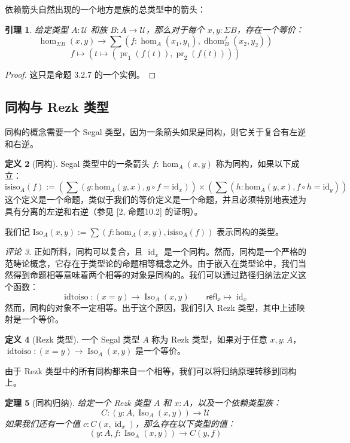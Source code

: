 \documentclass{ctexrep}
\theoremstyle{plain}
\newtheorem{theorem}{定理}[section]
\newtheorem{lemma}[theorem]{引理}
\theoremstyle{definition}
\newtheorem{definition}[theorem]{定义}
\theoremstyle{remark}
\newtheorem{remark}[theorem]{评论}
\theoremstyle{definition}
\theoremstyle{definition}
\theoremstyle{definition}
\newcommand{\refl}{\mathsf{refl}}
\newcommand{\id}{\operatorname{id}}
\newcommand{\UU}{\mathcal{U}}
\newcommand{\dhom}{\operatorname{dhom}}
\newcommand{\Iso}{\operatorname{Iso}}
\newcommand{\idtoiso}{\operatorname{idtoiso}}
\begin{document}
依赖箭头自然出现的一个地方是族的总类型中的箭头：

\begin{lemma}
给定类型 $A:\UU$ 和族 $B:A\to\UU$，那么对于每个 $x,y:\Sigma B$，存在一个等价：
\[
\hom_{\Sigma B}(x,y) \to \sum \left( f:\hom_A(x_1,y_1), \dhom_B^f(x_2,y_2) \right)
\]
\[
f \mapsto (t \mapsto (\operatorname{pr}_1(f(t)), \operatorname{pr}_2(f(t))))
\]
\end{lemma}

\begin{proof}
这只是命题 3.2.7 的一个实例。
\end{proof}

\subsection{同构与 Rezk 类型}

同构的概念需要一个 Segal 类型，因为一条箭头如果是同构，则它关于复合有左逆和右逆。

\begin{definition}[同构]
Segal 类型中的一条箭头 $f:\hom_A(x,y)$ 称为同构，如果以下成立：
\[
\text{isiso}_A(f) := \left( \sum (g : \text{hom}_A(y, x), g \circ f = \text{id}_x) \right) \times \left( \sum (h : \text{hom}_A(y, x), f \circ h = \text{id}_y) \right)
\]
这个定义是一个命题，类似于我们的等价定义是一个命题，并且必须特别地表述为具有分离的左逆和右逆（参见 [2, 命题10.2] 的证明）。

我们记 $\text{Iso}_A(x, y) := \sum (f : \text{hom}_A(x, y), \text{isiso}_A(f))$ 表示同构的类型。
\end{definition}

\begin{remark}
正如所料，同构可以复合，且 $\id_x$ 是一个同构。然而，同构是一个严格的范畴论概念，它存在于类型论的命题相等概念之外。由于嵌入在类型论中，我们当然得到命题相等意味着两个相等的对象是同构的。我们可以通过路径归纳法定义这个函数：
\[
\idtoiso : (x=y) \to \Iso_A(x,y) \qquad \refl_x \mapsto \id_x
\]
然而，同构的对象不一定相等。出于这个原因，我们引入 Rezk 类型，其中上述映射是一个等价。
\end{remark}

\begin{definition}[Rezk 类型]
一个 Segal 类型 $A$ 称为 Rezk 类型，如果对于任意 $x,y:A$，$\idtoiso : (x=y) \to \Iso_A(x,y)$ 是一个等价。
\end{definition}

由于 Rezk 类型中的所有同构都来自一个相等，我们可以将归纳原理转移到同构上。

\begin{theorem}[同构归纳]
给定一个 Rezk 类型 $A$ 和 $x:A$，以及一个依赖类型族：
\[
C : (y:A, \Iso_A(x,y)) \to \UU
\]
如果我们还有一个值 $c : C(x,\id_x)$，那么存在以下类型的值：
\[
(y:A, f:\Iso_A(x,y)) \to C(y,f)
\]
\end{theorem}
\end{document}
